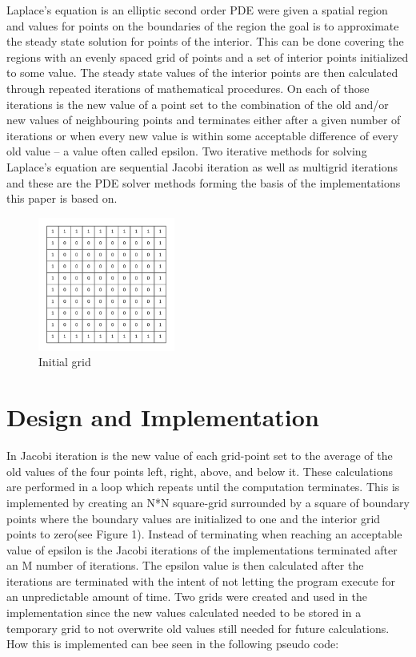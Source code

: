 \documentclass{article}
\begin{document}
Laplace’s equation is an elliptic second order PDE were given a spatial region and values for points on the boundaries of the region the goal is to approximate the steady state solution for points of the interior. This can be done covering the regions with an evenly spaced grid of points and a set of interior points initialized to some value. The steady state values of the interior points are then calculated through repeated iterations of mathematical procedures. On each of those iterations is the new value of a point set to the combination of the old and/or new values of neighbouring points and terminates either after a given number of iterations or when every new value is within some acceptable difference of every old value – a value often called epsilon. Two iterative methods for solving Laplace’s equation are sequential Jacobi iteration as well as multigrid iterations and these are the PDE solver methods forming the basis of the implementations this paper is based on. 

\begin{figure}
    \includegraphics[width=0.4\textwidth]{../images/grid.png}
    \caption{Initial grid}
    \label{grid}
\end{figure}
\newpage


\section{Design and Implementation}\label{programs}

In Jacobi iteration is the new value of each grid-point set to the average of the old values of the four points left, right, above, and below it. These calculations are performed in a loop which repeats until the computation terminates. This is implemented by creating an N*N square-grid surrounded by a square of boundary points where the boundary values are initialized to one and the interior grid points to zero(see Figure 1). Instead of terminating when reaching an acceptable value of epsilon is the Jacobi iterations of the implementations terminated after an M number of iterations. The epsilon value is then calculated after the iterations are terminated with the intent of not letting the program execute for an unpredictable amount of time. Two grids were created and used in the implementation since the new values calculated needed to be stored in a temporary grid to not overwrite old values still needed for future calculations. How this is implemented can bee seen in the following pseudo code:
\end{document}

